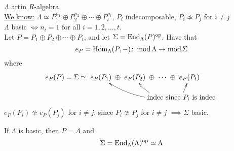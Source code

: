 \begin{note}
$\Lambda$ artin $R$-algebra\\
\underline{We know:} $\Lambda \simeq P_1^{n_1} \oplus P_2^{n_2} \oplus \cdots \oplus P_t^{n_t}$, $P_i$ indecomposable, $P_i \not\simeq P_j$ for $i \neq j$\\
$\Lambda$ basic $\iff n_i = 1$ for all $i = 1, 2, \ldots, t $.\\
Let $P = P_1 \oplus P_2 \oplus \cdots \oplus P_t$, and let $\Sigma = \operatorname{End}_\Lambda(P)^{{\operatorname{op}\nolimits}}$. Have that \[ e_P = \operatorname{Hom}_\Lambda(P,-)\colon \operatorname{mod}\nolimits \Lambda \to \operatorname{mod}\nolimits \Sigma \]
where \[ e_P(P) = \Sigma \simeq
\xy
\xymatrix@C-1pc"sum"{e_P(P_1) \ar@{}[r]|-*[@]{\oplus} & e_P(P_2) \ar@{}[r]|-*[@]{\oplus} & \cdots \ar@{}[r]|-*[@]{\oplus} & e_P(P_t)}
\POS+(40, -10)
\xymatrix{ \ar@/^1pc/["sum"]\ar@/^1pc/["sum"r]\ar["sum"rrr] \text{indec since } P_i \text{ is indec}}
\endxy
\]
$e_P(P_i) \not\simeq e_P(P_j)$ for $i \neq j$, since $P_i \not\simeq P_j$ for $i \neq j$ $\implies \Sigma$ basic.
\end{note}


\begin{note}
If $\Lambda$ is basic, then $P = \Lambda$ and \[ \Sigma = \operatorname{End}_\Lambda(\Lambda)^{{\operatorname{op}\nolimits}} \simeq \Lambda \]
\end{note}

